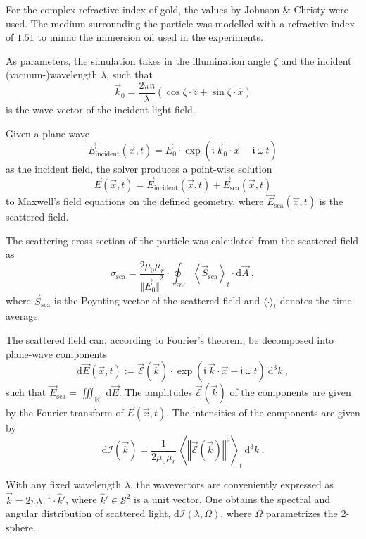 \documentclass[10pt]{article}
\begin{document}
For the complex refractive index of gold, the values by Johnson \& Christy \cite{Johnson1972} were used. 
The medium surrounding the particle was modelled with a refractive index of $1.51$ to mimic the immersion oil used in the experiments. 

As parameters, the simulation takes in the illumination angle $\zeta$ and the incident (vacuum-)wavelength $\lambda$, such that
$$
    \vec{k}_0 = \frac{2\pi \mathfrak{n}}{\lambda} \left( \cos\zeta \cdot \hat{z} + \sin\zeta \cdot \hat{x} \right)
$$
is the wave vector of the incident light field. 

Given a plane wave 
$$
    \vec{E}_\mathrm{incident}(\vec{x},t) = \vec{E}_0 \cdot \exp\!\left( \mathfrak{i}\ \vec{k}_0\cdot\vec{x} - \mathfrak{i}\ \omega\ t \right)
$$
as the incident field, the solver produces a point-wise solution 
$$
    \vec{E}(\vec{x},t) = \vec{E}_\mathrm{incident}(\vec{x},t) + \vec{E}_\mathrm{sca}(\vec{x},t)
$$ 
to Maxwell's field equations on the defined geometry, where $\vec{E}_\mathrm{sca}(\vec{x},t)$ is the scattered field. 






The scattering cross-section of the particle was calculated from the scattered field as 
$$
    \sigma_\mathrm{sca} = \frac{2 \mu_0 \mu_r}{ {\bigl\Vert \vec{E}_0 \bigr\Vert}^2 } \cdot \oint_{\partial V} {\left\langle \vec{S}_\mathrm{sca} \right\rangle}_t \cdot\mathrm{d}\vec{A} \ ,
$$
where $\vec{S}_\mathrm{sca}$ is the Poynting vector of the scattered field and $\langle\cdot\rangle_t$ denotes the time average. 

The scattered field can, according to Fourier's theorem, be decomposed into plane-wave components
$$
    \mathrm{d}\vec{E}(\vec{x},t) := \vec{\mathcal{E}}(\vec{k}) 
    \cdot 
    \exp{\!\left(\mathfrak{i}\ \vec{k}\cdot\vec{x} - \mathfrak{i}\ \omega\ t \right)}
    \ \mathrm{d}^3 k
    \ , 
$$
such that $ \vec{E}_\mathrm{sca} = \iiint_{\mathds{R}^3}\,\mathrm{d}\vec{E}$. 
The amplitudes $\vec{\mathcal{E}}(\vec{k})$ of the components are given by the Fourier transform of $\vec{E}(\vec{x},t)$. 
The intensities of the components are given by \cite{Griffiths-ED,MA} 
$$
    \mathrm{d}\mathcal{I}(\vec{k}) = \frac{ 1 }{ 2\mu_0 \mu_r }\,{\left\langle {\left\Vert \vec{\mathcal{E}}(\vec{k}) \right\Vert}^2 \right\rangle}_t \ \mathrm{d}^3k
    \ .
$$

With any fixed wavelength $\lambda$, the wavevectors are conveniently expressed as $ \vec{k} = 2 \pi \lambda^{-1} \cdot \hat{k}'$, where \mbox{$\hat{k}' \in \mathcal{S}^2$} is a unit vector. 
One obtains the spectral and angular distribution of scattered light, $\mathrm{d}\mathcal{I}(\lambda, \Omega)$, where $\Omega$ parametrizes the 2-sphere. 
\end{document}
